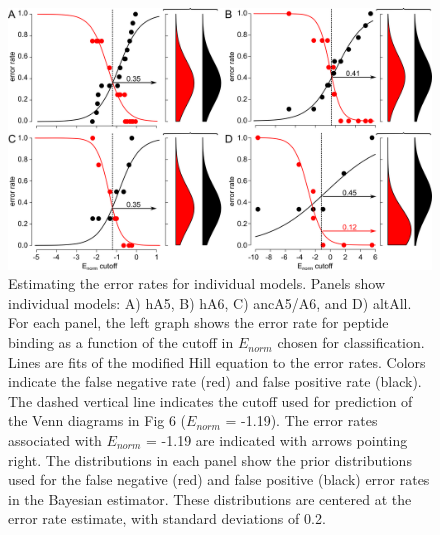 \begin{figure}%
\centering
	\includegraphics{ch6-figS5.png} 
\caption[Estimating the error rates for individual models]{Estimating the error rates for individual models. Panels show individual models: A) hA5, B) hA6, C) ancA5/A6, and D)
altAll. For each panel, the left graph shows the error rate for peptide
binding as a function of the cutoff in $E_{norm}$ chosen for classification.
Lines are fits of the modified Hill equation to the error rates. Colors
indicate the false negative rate (red) and false positive rate (black).
The dashed vertical line indicates the cutoff used for prediction
of the Venn diagrams in Fig 6 ($E_{norm}$ = -1.19). The error rates
associated with $E_{norm}$ = -1.19 are indicated with arrows pointing
right. The distributions in each panel show the prior distributions
used for the false negative (red) and false positive (black) error
rates in the Bayesian estimator. These distributions are centered
at the error rate estimate, with standard deviations of 0.2.\label{samplefigure}}	
\end{figure}


